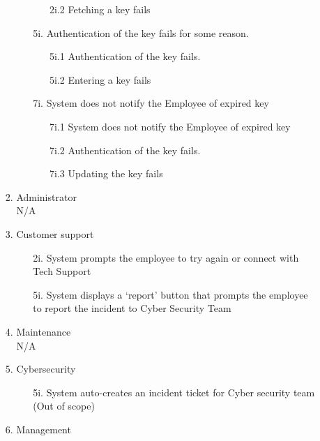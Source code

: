 \documentclass[]{article}
\begin{document}
\begin{enumerate}[{\bf BE1.}]
\begin{enumerate}[{\bf BE9.}]
\begin{enumerate}[{\bf VP1.}]
\begin{enumerate}
\begin{enumerate}
                        \item[2i.2] Fetching a key fails
                    \end{enumerate}
                    \item[5i.]  Authentication of the key fails for some reason.  
                    \begin{enumerate}
                        \item[5i.1] Authentication of the key fails.
                        \item[5i.2] Entering a key fails
                    \end{enumerate}
		    \item[7i.]  System does not notify the Employee of expired key
                    \begin{enumerate}
                        \item[7i.1] System does not notify the Employee of expired key
                        \item[7i.2] Authentication of the key fails.
			\item[7i.3] Updating the key fails
                    \end{enumerate}
                \end{enumerate}
		  \item Administrator \\
			N/A
            \item Customer support \\
	           \begin{enumerate}
                        \item[2i.] System prompts the employee to try again or connect with Tech Support
                        \item[5i.] System displays a ‘report’ button that prompts the employee to report the incident to Cyber Security Team 
                    \end{enumerate}
            \item Maintenance \\
	            N/A
            \item Cybersecurity \\
            	\begin{enumerate}
                        \item[5i.] System auto-creates an incident ticket for Cyber security team (Out of scope)
                \end{enumerate}
            \item Management \\

\end{enumerate}
\end{enumerate}
\end{enumerate}
\end{document}
